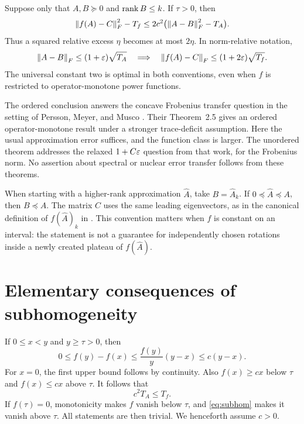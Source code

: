 \documentclass[11pt]{article}
\newcommand{\TA}{T_A}
\newcommand{\Tf}{T_f}
\begin{document}
\begin{theorem}\label{thm:unordered}
Suppose only that $A,B\succeq0$ and $\operatorname{rank} B\le k$. If $\tau>0$, then
\begin{equation}\label{eq:unordered}
 \norm{f(A)-C}_F^2-\Tf
 \le 2c^2\bigl(\norm{A-B}_F^2-\TA\bigr).
\end{equation}
Thus a squared relative excess $\eta$ becomes at most $2\eta$. In norm-relative notation,
\[
 \norm{A-B}_F\le(1+\eps)\sqrt{\TA}
 \quad\Longrightarrow\quad
 \norm{f(A)-C}_F\le(1+2\eps)\sqrt{\Tf}.
\]
The universal constant two is optimal in both conventions, even when $f$ is restricted to operator-monotone power functions.
\end{theorem}

The ordered conclusion answers the concave Frobenius transfer question in the setting of Persson, Meyer, and Musco \cite[Table~1 and Section~5]{PMM2025}. Their Theorem~2.5 gives an ordered operator-monotone result under a stronger trace-deficit assumption. Here the usual approximation error suffices, and the function class is larger. The unordered theorem addresses the relaxed $1+C\varepsilon$ question from that work, for the Frobenius norm. No assertion about spectral or nuclear error transfer follows from these theorems.

When starting with a higher-rank approximation $\widehat A$, take $B=\widehat A_k$. If $0\preceq\widehat A\preceq A$, then $B\preceq A$. The matrix $C$ uses the same leading eigenvectors, as in the canonical definition of $f(\widehat A)_k$ in \cite[Eq.~(2)]{PMM2025}. This convention matters when $f$ is constant on an interval: the statement is not a guarantee for independently chosen rotations inside a newly created plateau of $f(\widehat A)$.

\section{Elementary consequences of subhomogeneity}
If $0\le x<y$ and $y\ge\tau>0$, then
\begin{equation}\label{eq:lip}
 0\le f(y)-f(x)\le \frac{f(y)}y(y-x)\le c(y-x).
\end{equation}
For $x=0$, the first upper bound follows by continuity. Also $f(x)\ge cx$ below $\tau$ and $f(x)\le cx$ above $\tau$. It follows that
\begin{equation}\label{eq:tail}
 c^2\TA\le\Tf.
\end{equation}
If $f(\tau)=0$, monotonicity makes $f$ vanish below $\tau$, and \eqref{eq:subhom} makes it vanish above $\tau$. All statements are then trivial. We henceforth assume $c>0$.
\end{document}
